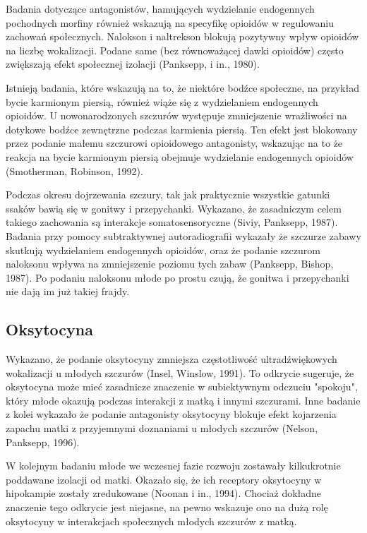 \documentclass{psychol}
\begin{document}
Badania dotyczące antagonistów, hamujących wydzielanie endogennych pochodnych morfiny również wskazują na specyfikę opioidów w regulowaniu zachowań społecznych. Nalokson i naltrekson blokują pozytywny wpływ opioidów na liczbę wokalizacji. Podane same (bez równoważącej dawki opioidów) często zwiększają efekt społecznej izolacji (Panksepp, i in., 1980).

Istnieją badania, które wskazują na to, że niektóre bodźce społeczne, na przykład bycie karmionym piersią, również wiąże się z wydzielaniem endogennych opioidów. U nowonarodzonych szczurów występuje zmniejszenie wrażliwości na dotykowe bodźce zewnętrzne podczas karmienia piersią. Ten efekt jest blokowany przez podanie małemu szczurowi opioidowego antagonisty, wskazując na to że reakcja na bycie karmionym piersią obejmuje wydzielanie endogennych opioidów (Smotherman, Robinson, 1992).

Podczas okresu dojrzewania szczury, tak jak praktycznie wszystkie gatunki ssaków bawią się w gonitwy i przepychanki. Wykazano, że zasadniczym celem takiego zachowania są interakcje somatosensoryczne (Siviy, Panksepp, 1987). Badania przy pomocy subtraktywnej autoradiografii wykazały że szczurze zabawy skutkują wydzielaniem endogennych opioidów, oraz że podanie szczurom naloksonu wpływa na zmniejszenie poziomu tych zabaw (Panksepp, Bishop, 1987).  Po podaniu naloksonu młode po prostu czują, że gonitwa i przepychanki nie dają im już takiej frajdy.

\subsection{Oksytocyna}

Wykazano, że podanie oksytocyny zmniejsza częstotliwość ultradźwiękowych wokalizacji u młodych szczurów (Insel, Winslow, 1991). To odkrycie sugeruje, że oksytocyna może mieć zasadnicze znaczenie w subiektywnym odczuciu "spokoju", który młode okazują podczas interakcji z matką i innymi szczurami. Inne badanie z kolei wykazało że podanie antagonisty oksytocyny blokuje efekt kojarzenia zapachu matki z przyjemnymi doznaniami u młodych szczurów (Nelson, Panksepp, 1996).

W kolejnym badaniu młode we wczesnej fazie rozwoju zostawały kilkukrotnie poddawane izolacji od matki. Okazało się, że ich receptory oksytocyny w hipokampie zostały zredukowane \colorbox{yellow!30}{(Noonan i in., 1994)}. Chociaż dokładne znaczenie tego odkrycie jest niejasne, na pewno wskazuje ono na dużą rolę oksytocyny w interakcjach społecznych młodych szczurów z matką.
\end{document}

